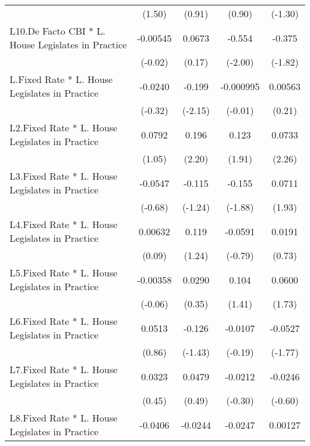 {\begin{longtable}{l*{4}{c}}
                &   (1.50)         &   (0.91)         &   (0.90)         &  (-1.30)         \\
[1em]
L10.De Facto CBI * L. House Legislates in Practice& -0.00545         &   0.0673         &   -0.554\sym{*}  &   -0.375         \\
                &  (-0.02)         &   (0.17)         &  (-2.00)         &  (-1.82)         \\
[1em]
L.Fixed Rate * L. House Legislates in Practice&  -0.0240         &   -0.199\sym{*}  &-0.000995         &  0.00563         \\
                &  (-0.32)         &  (-2.15)         &  (-0.01)         &   (0.21)         \\
[1em]
L2.Fixed Rate * L. House Legislates in Practice&   0.0792         &    0.196\sym{*}  &    0.123         &   0.0733\sym{*}  \\
                &   (1.05)         &   (2.20)         &   (1.91)         &   (2.26)         \\
[1em]
L3.Fixed Rate * L. House Legislates in Practice&  -0.0547         &   -0.115         &   -0.155         &   0.0711         \\
                &  (-0.68)         &  (-1.24)         &  (-1.88)         &   (1.93)         \\
[1em]
L4.Fixed Rate * L. House Legislates in Practice&  0.00632         &    0.119         &  -0.0591         &   0.0191         \\
                &   (0.09)         &   (1.24)         &  (-0.79)         &   (0.73)         \\
[1em]
L5.Fixed Rate * L. House Legislates in Practice& -0.00358         &   0.0290         &    0.104         &   0.0600         \\
                &  (-0.06)         &   (0.35)         &   (1.41)         &   (1.73)         \\
[1em]
L6.Fixed Rate * L. House Legislates in Practice&   0.0513         &   -0.126         &  -0.0107         &  -0.0527         \\
                &   (0.86)         &  (-1.43)         &  (-0.19)         &  (-1.77)         \\
[1em]
L7.Fixed Rate * L. House Legislates in Practice&   0.0323         &   0.0479         &  -0.0212         &  -0.0246         \\
                &   (0.45)         &   (0.49)         &  (-0.30)         &  (-0.60)         \\
[1em]
L8.Fixed Rate * L. House Legislates in Practice&  -0.0406         &  -0.0244         &  -0.0247         &  0.00127         \\

\end{longtable}}
